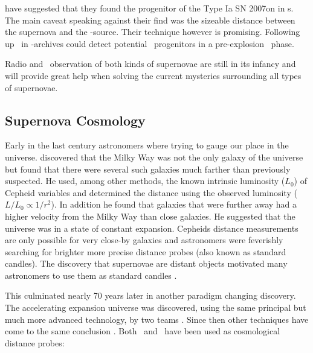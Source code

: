 \cite{2008Natur.451..802V} have suggested that they found the progenitor of the Type Ia SN 2007on in \xray s. The main caveat speaking against their find was the sizeable distance between the supernova and the \xray-source. Their technique however is promising. Following up \sneia\ in \xray-archives could detect potential \sneia\ progenitors in a pre-explosion \xray\ phase.

Radio and \xray\ observation of both kinds of supernovae are still in its infancy and will provide great help when solving the current mysteries surrounding all types of supernovae.

\subsection{Supernova Cosmology}
Early in the last century astronomers where trying to gauge our place in the universe. \citet{1929PNAS...15..168H} discovered that the Milky Way was not the only galaxy of the universe but found that there were several such galaxies much farther than previously suspected. He used, among other methods, the known intrinsic luminosity ($L_0$) of Cepheid variables and determined the distance using the observed luminosity ($L/L_0 \propto 1/r^2$).  In addition he found that galaxies that were further away had a higher velocity from the Milky Way than close galaxies. He suggested that the universe was in a state of constant expansion. Cepheids distance measurements are only possible for very close-by galaxies and astronomers were feverishly searching for brighter more precise distance probes (also known as standard candles). The discovery that supernovae are distant objects \citep{1934PNAS...20..254B} motivated many astronomers to use them as standard candles \cite{1938ApJ....88..285B, 1960ZA.....49..201V, 1968AJ.....73.1021K, 1999ApJ...517..565P}. 

This culminated nearly 70 years later in another paradigm changing discovery. The accelerating expansion universe was discovered, using the same principal but much more advanced technology, by two teams \citep{1998AJ....116.1009R}. 
Since then other techniques have come to the same conclusion \cite[e.g.][]{2011MNRAS.tmp..951B}. Both \sneia\ and \snii\ have been used as cosmological distance probes:

